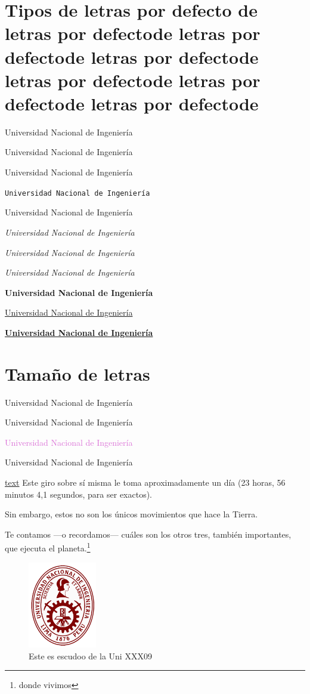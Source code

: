 \documentclass[12pt,a4paper]{article}
\begin{document}
\listoffigures	
\renewcommand{\spanishtablename}{Mis Tablitas}
\listoftables

\section[de letras]{Tipos de letras por defecto de letras por defectode letras por defectode letras por defectode letras por defectode letras por defectode letras por defectode}
	Universidad Nacional de Ingeniería
	
	\textrm{Universidad Nacional de Ingeniería}
	
	\textsf{Universidad Nacional de Ingeniería}
	
	\texttt{Universidad Nacional de Ingeniería}
	
	{\ttfamily Universidad Nacional de Ingeniería}
	
	\textit{Universidad Nacional de Ingeniería}
	
	\textsl{Universidad Nacional de Ingeniería}
	
	{\itshape Universidad Nacional de Ingeniería}
	
	\textbf{Universidad Nacional de Ingeniería}
	
	\underline{Universidad Nacional de Ingeniería}%
	
	\underline{\textbf{Universidad Nacional de Ingeniería}}
	
\section{Tamaño de letras}\label{sec1}
	
	{\Huge Universidad Nacional de Ingeniería}
	
	{\LARGE Universidad Nacional de Ingeniería}
	
	\textcolor{Orchid}{Universidad Nacional de Ingeniería}
	
	{\color{Red}Universidad Nacional de Ingeniería}
	
\underline{text}
	\newpage
	Este giro sobre sí misma le toma aproximadamente un día (23 horas, 56 minutos 4,1 segundos, para ser exactos). 
	
	Sin embargo, estos no son los únicos movimientos que hace la Tierra.
	
	Te contamos —o recordamos— cuáles son los otros tres, también importantes, que ejecuta el planeta.\footnote{donde vivimos}
	\begin{figure}[H]
		\centering
		\includegraphics[width=3cm]{escudo}
		\caption{Este es escudoo de la Uni XXX09} \label{fig1}
	\end{figure}
	
\end{document}
